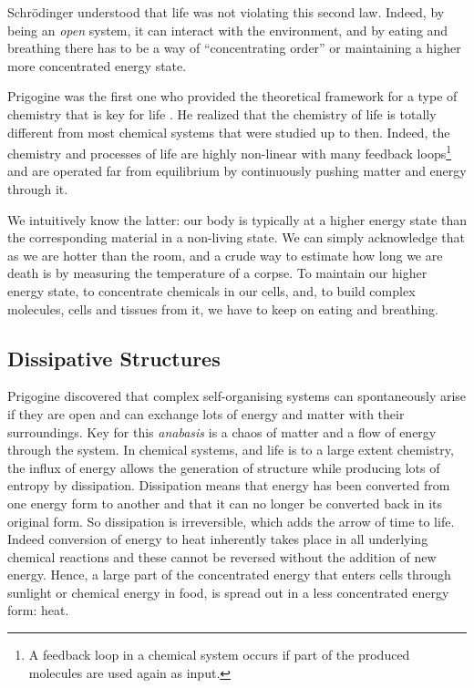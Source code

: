 \documentclass[
  11pt,
]{book}
\begin{document}
Schrödinger understood that life was not violating this second law. Indeed, by being an \emph{open} system, it can interact with the environment, and by eating and breathing there has to be a way of ``concentrating order'' or maintaining a higher more concentrated energy state.

Prigogine was the first one who provided the theoretical framework for a type of chemistry that is key for life \citep{prigogineStengers1984}. He realized that the chemistry of life is totally different from most chemical systems that were studied up to then. Indeed, the chemistry and processes of life are highly non-linear with many feedback loops\footnote{A feedback loop in a chemical system occurs if part of the produced molecules are used again as input.} and are operated far from equilibrium by continuously pushing matter and energy through it.

We intuitively know the latter: our body is typically at a higher energy state than the corresponding material in a non-living state. We can simply acknowledge that as we are hotter than the room, and a crude way to estimate how long we are death is by measuring the temperature of a corpse. To maintain our higher energy state, to concentrate chemicals in our cells, and, to build complex molecules, cells and tissues from it, we have to keep on eating and breathing.

\pagebreak

\hypertarget{dissipative-structures}{%
\subsection{Dissipative Structures}\label{dissipative-structures}}

Prigogine discovered that complex self-organising systems can spontaneously arise if they are open and can exchange lots of energy and matter with their surroundings.
Key for this \emph{anabasis} is a chaos of matter and a flow of energy through the system.
In chemical systems, and life is to a large extent chemistry, the influx of energy allows the generation of structure while producing lots of entropy by dissipation. Dissipation means that energy has been converted from one energy form to another and that it can no longer be converted back in its original form. So dissipation is irreversible, which adds the arrow of time to life. Indeed conversion of energy to heat inherently takes place in all underlying chemical reactions and these cannot be reversed without the addition of new energy. Hence, a large part of the concentrated energy that enters cells through sunlight or chemical energy in food, is spread out in a less concentrated energy form: heat.
\end{document}
